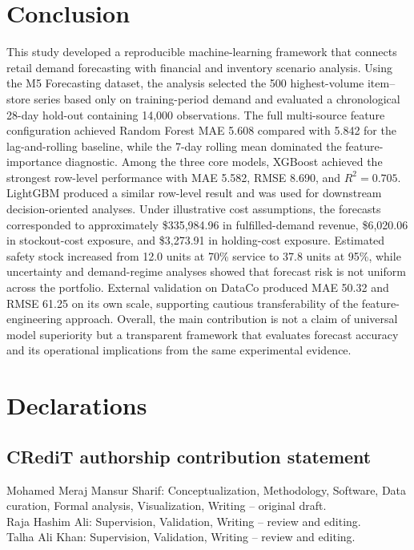 \section{Conclusion}

This study developed a reproducible machine-learning framework that connects retail demand forecasting with financial and inventory scenario analysis.
Using the M5 Forecasting dataset, the analysis selected the 500 highest-volume item--store series based only on training-period demand and evaluated a chronological 28-day hold-out containing 14,000 observations.
The full multi-source feature configuration achieved Random Forest MAE 5.608 compared with 5.842 for the lag-and-rolling baseline, while the 7-day rolling mean dominated the feature-importance diagnostic.
Among the three core models, XGBoost achieved the strongest row-level performance with MAE 5.582, RMSE 8.690, and $R^2=0.705$.
LightGBM produced a similar row-level result and was used for downstream decision-oriented analyses.
Under illustrative cost assumptions, the forecasts corresponded to approximately \$335,984.96 in fulfilled-demand revenue, \$6,020.06 in stockout-cost exposure, and \$3,273.91 in holding-cost exposure.
Estimated safety stock increased from 12.0 units at 70\% service to 37.8 units at 95\%, while uncertainty and demand-regime analyses showed that forecast risk is not uniform across the portfolio.
External validation on DataCo produced MAE 50.32 and RMSE 61.25 on its own scale, supporting cautious transferability of the feature-engineering approach.
Overall, the main contribution is not a claim of universal model superiority but a transparent framework that evaluates forecast accuracy and its operational implications from the same experimental evidence.

\section*{Declarations}

\subsection*{CRediT authorship contribution statement}
Mohamed Meraj Mansur Sharif: Conceptualization, Methodology, Software, Data curation, Formal analysis, Visualization, Writing -- original draft.\\
Raja Hashim Ali: Supervision, Validation, Writing -- review and editing.\\
Talha Ali Khan: Supervision, Validation, Writing -- review and editing.

